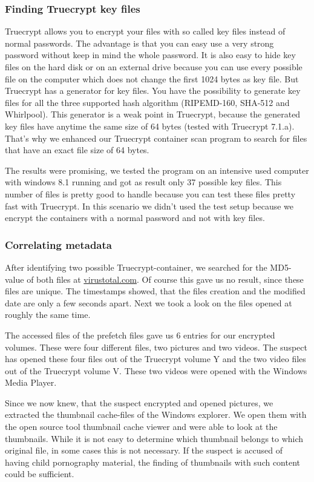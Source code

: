 \subsubsection{Finding Truecrypt key files}
Truecrypt allows you to encrypt your files with so called key files instead of normal passwords. The advantage is that you can easy use a very strong password without keep in mind the whole password. It is also easy to hide key files on the hard disk or on an external drive because you can use every possible file on the computer which does not change the first 1024 bytes as key file. But Truecrypt has a generator for key files. You have the possibility to generate key files for all the three supported hash algorithm (RIPEMD-160, SHA-512 and Whirlpool). This generator is a weak point in Truecrypt, because the generated key files have anytime the same size of 64 bytes (tested with Truecrypt 7.1.a). That's why we enhanced our Truecrypt container scan program to search for files that have an exact file size of 64 bytes.

The results were promising, we tested the program on an intensive used computer with windows 8.1 running and got as result only 37 possible key files. This number of files is pretty good to handle because you can test these files pretty fast with Truecrypt. In this scenario we didn't used the test setup because we encrypt the containers with a normal password and not with key files.
\subsubsection{Correlating metadata}
After identifying two possible Truecrypt-container, we searched for the MD5-value of both files at \url{virustotal.com}. Of course this gave us no result, since these files are unique. The timestamps showed, that the files creation and the modified date are only a few seconds apart. Next we took a look on the files opened at roughly the same time. 

The accessed files of the prefetch files gave us 6 entries for our encrypted volumes. These were four different files, two pictures and two videos.
The suspect has opened these four files out of the Truecrypt volume Y and the two video files out of the Truecrypt volume V. These two videos were opened with the Windows Media Player.

Since we now knew, that the suspect encrypted and opened pictures, we extracted the thumbnail cache-files of the Windows explorer. We open them with the open source tool thumbnail cache viewer and were able to look at the thumbnails. While it is not easy to determine which thumbnail belongs to which original file, in some cases this is not necessary. If the suspect is accused of having child pornography material, the finding of thumbnails with such content could be sufficient.


